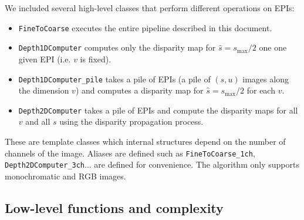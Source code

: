 \documentclass{article}
\theoremstyle{definition}
\begin{document}
We included several high-level classes that perform different operations on EPIs:
\begin{itemize}
 \item \verb#FineToCoarse# executes the entire pipeline described in this document.
 \item \verb#Depth1DComputer# computes only the disparity map for $\widehat{s} = s_{\max}/2$ one one given EPI (i.e. $v$ is fixed).
 \item \verb#Depth1DComputer_pile# takes a pile of EPIs (a pile of $(s, u)$ images along the dimension $v$) and computes a disparity map for $\widehat{s} = s_{\max}/2$ for each $v$.
 \item \verb#Depth2DComputer# takes a pile of EPIs and compute the disparity maps for all $v$ and all $s$ using the disparity propagation process.
\end{itemize}
These are template classes which internal structures depend on the number of channels of the image. Aliases are defined such as \verb#FineToCoarse_1ch#, \verb#Depth2DComputer_3ch#... are defined for convenience. The algorithm only supports monochromatic and RGB images.


\subsection{Low-level functions and complexity}
\end{document}
